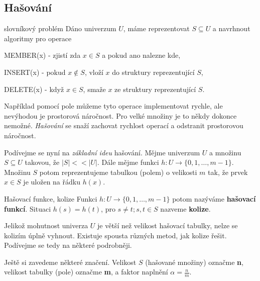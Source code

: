 \newcommand{\nadpis}[1]{\pagebreak[2]\ramcek{\subsubsection*{#1}}}

\subsection{Hašování}

\begin{definiceN}{slovníkový problém} Dáno univerzum $U$, máme reprezentovat
$S \subseteq U$ a navrhnout algoritmy pro operace
\begin{pitemize}
\item MEMBER(x) - zjistí zda $x \in S$ a pokud ano nalezne kde,
\item INSERT(x) - pokud $x \notin S$, vloží $x$ do struktury reprezentující $S$,
\item DELETE(x) - když $x \in S$, smaže $x$ ze struktury reprezentující $S$.
\end{pitemize}
\end{definiceN}

Například pomocí pole můžeme tyto operace implementovat rychle, ale nevýhodou
je prostorová náročnost. Pro velké množiny je to někdy dokonce nemožné.
\emph{Hašování} se snaží zachovat rychlost operací a odstranit prostorovou
náročnost.

Podívejme se nyní na \emph{základní ideu} hašování. Mějme univerzum $U$ a
množinu $S \subseteq U$ takovou, že $|S| << |U|$. Dále mějme funkci
$h:U\rightarrow\{0,1,\dots,m-1\}$. Množinu $S$ potom reprezentujeme tabulkou
(polem) o velikosti $m$ tak, že prvek $x \in S$ je uložen na řádku $h(x)$.

\begin{definiceN}{Hašovací funkce, kolize} Funkci
$h:U\rightarrow\{0,1,\dots,m-1\}$ potom nazýváme \textbf{hašovací funkcí}.
Situaci $h(s)=h(t)$, pro $s \neq t; s,t \in S$  nazveme \textbf{kolize}.
\end{definiceN}

Jelikož mohutnost univerza $U$ je větší než velikost hašovací tabulky, nelze se
kolizím úplně vyhnout. Existuje spousta různých metod, jak kolize řešit.
Podívejme se tedy na některé podrobněji.

\begin{definice}
Ještě si zavedeme některé značení. Velikost $S$ (hašované množiny) označme
\textbf{n}, velikost tabulky (pole) označme \textbf{m}, a faktor naplnění
\textbf{$\alpha=\frac{n}{m}$}.
\end{definice}

